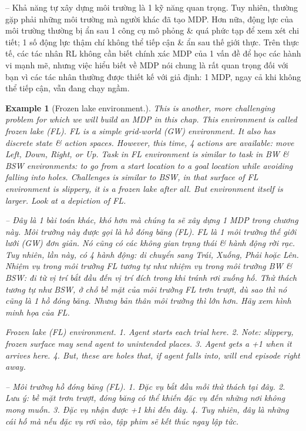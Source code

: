 \documentclass{article}
\newtheorem{example}{Example}
\begin{document}
\begin{itemize}
\begin{itemize}
        -- Khả năng tự xây dựng môi trường là 1 kỹ năng quan trọng. Tuy nhiên, thường gặp phải những môi trường mà người khác đã tạo MDP. Hơn nữa, động lực của môi trường thường bị ẩn sau 1 công cụ mô phỏng \& quá phức tạp để xem xét chi tiết; 1 số động lực thậm chí không thể tiếp cận \& ẩn sau thế giới thực. Trên thực tế, các tác nhân RL không cần biết chính xác MDP của 1 vấn đề để học các hành vi mạnh mẽ, nhưng việc hiểu biết về MDP nói chung là rất quan trọng đối với bạn vì các tác nhân thường được thiết kế với giả định: 1 MDP, ngay cả khi không thể tiếp cận, vẫn đang chạy ngầm.

        \begin{example}[Frozen lake environment.]
            This is another, more challenging problem for which we will build an MDP in this chap. This environment is called frozen lake (FL). FL is a simple grid-world (GW) environment. It also has discrete state \& action spaces. However, this time, 4 actions are available: move Left, Down, Right, or Up. Task in FL environment is similar to task in BW \& BSW environments: to go from a start location to a goal location while avoiding falling into holes. Challenges is similar to BSW, in that surface of FL environment is slippery, it is a frozen lake after all. But environment itself is larger. Look at a depiction of FL.

            -- Đây là 1 bài toán khác, khó hơn mà chúng ta sẽ xây dựng 1 MDP trong chương này. Môi trường này được gọi là hồ đóng băng (FL). FL là 1 môi trường thế giới lưới (GW) đơn giản. Nó cũng có các không gian trạng thái \& hành động rời rạc. Tuy nhiên, lần này, có 4 hành động: di chuyển sang Trái, Xuống, Phải hoặc Lên. Nhiệm vụ trong môi trường FL tương tự như nhiệm vụ trong môi trường BW \& BSW: đi từ vị trí bắt đầu đến vị trí đích trong khi tránh rơi xuống hố. Thử thách tương tự như BSW, ở chỗ bề mặt của môi trường FL trơn trượt, dù sao thì nó cũng là 1 hồ đóng băng. Nhưng bản thân môi trường thì lớn hơn. Hãy xem hình minh họa của FL.

            {\sf Frozen lake (FL) environment.} 1. Agent starts each trial here. 2. Note: slippery, frozen surface may send agent to unintended places. 3. Agent gets a +1 when it arrives here. 4. But, these are holes that, if agent falls into, will end episode right away.

            -- {\sf Môi trường hồ đóng băng (FL).} 1. Đặc vụ bắt đầu mỗi thử thách tại đây. 2. Lưu ý: bề mặt trơn trượt, đóng băng có thể khiến đặc vụ đến những nơi không mong muốn. 3. Đặc vụ nhận được +1 khi đến đây. 4. Tuy nhiên, đây là những cái hố mà nếu đặc vụ rơi vào, tập phim sẽ kết thúc ngay lập tức.


\end{example}
\end{itemize}
\end{itemize}
\end{document}
